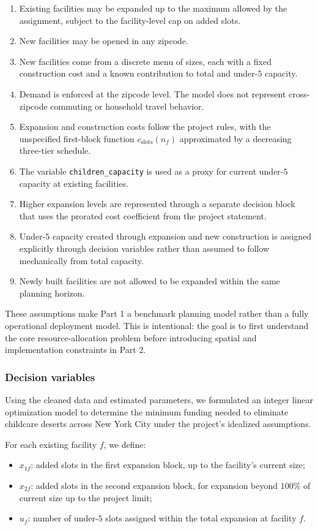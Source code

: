 \documentclass[11pt]{article}
\newcommand{\1}{\mathbb{I}}
\begin{document}
\begin{enumerate}
    \item Existing facilities may be expanded up to the maximum allowed by the assignment, subject to the facility-level cap on added slots.
    \item New facilities may be opened in any zipcode.
    \item New facilities come from a discrete menu of sizes, each with a fixed construction cost and a known contribution to total and under-\(5\) capacity.
    \item Demand is enforced at the zipcode level. The model does not represent cross-zipcode commuting or household travel behavior.
    \item Expansion and construction costs follow the project rules, with the unspecified first-block function \(c_{\text{slots}}(n_f)\) approximated by a decreasing three-tier schedule.
    \item The variable \texttt{children\_capacity} is used as a proxy for current under-\(5\) capacity at existing facilities.
    \item Higher expansion levels are represented through a separate decision block that uses the prorated cost coefficient from the project statement.
    \item Under-\(5\) capacity created through expansion and new construction is assigned explicitly through decision variables rather than assumed to follow mechanically from total capacity.
    \item Newly built facilities are not allowed to be expanded within the same planning horizon. 
\end{enumerate}

These assumptions make Part 1 a benchmark planning model rather than a fully operational deployment model. This is intentional: the goal is to first understand the core resource-allocation problem before introducing spatial and implementation constraints in Part 2.

\subsubsection{Decision variables}

Using the cleaned data and estimated parameters, we formulated an integer linear optimization model to determine the minimum funding needed to eliminate childcare deserts across New York City under the project's idealized assumptions.

\noindent
For each existing facility \(f\), we define:
\begin{itemize}
    \item \(x_{1f}\): added slots in the first expansion block, up to the facility’s current size;
    \item \(x_{2f}\): added slots in the second expansion block, for expansion beyond \(100\%\) of current size up to the project limit;
    \item \(u_f\): number of under-\(5\) slots assigned within the total expansion at facility \(f\).
\end{itemize}
\end{document}
